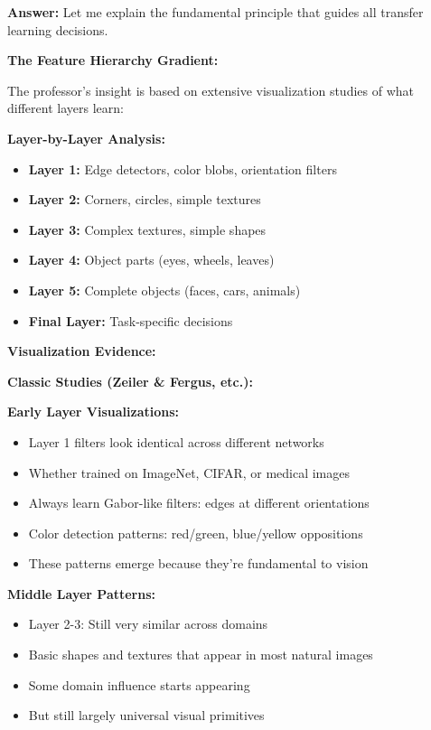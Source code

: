 \documentclass[12pt]{article}
\newcommand{\answer}[1]{{\color{answercolor}\textbf{Answer:} #1}}
\newcommand{\explanation}[1]{{\color{explanationcolor}#1}}
\begin{document}
\begin{enumerate}[(a)]
    \answer{
    Let me explain the fundamental principle that guides all transfer learning decisions.
    
    \textbf{The Feature Hierarchy Gradient:}
    
    \explanation{
    The professor's insight is based on extensive visualization studies of what different layers learn:
    
    \textbf{Layer-by-Layer Analysis:}
    \begin{itemize}
        \item \textbf{Layer 1:} Edge detectors, color blobs, orientation filters
        \item \textbf{Layer 2:} Corners, circles, simple textures
        \item \textbf{Layer 3:} Complex textures, simple shapes
        \item \textbf{Layer 4:} Object parts (eyes, wheels, leaves)
        \item \textbf{Layer 5:} Complete objects (faces, cars, animals)
        \item \textbf{Final Layer:} Task-specific decisions
    \end{itemize}
    }
    
    \textbf{Visualization Evidence:}
    
    \explanation{
    \textbf{Classic Studies (Zeiler \& Fergus, etc.):}
    
    \textbf{Early Layer Visualizations:}
    \begin{itemize}
        \item Layer 1 filters look identical across different networks
        \item Whether trained on ImageNet, CIFAR, or medical images
        \item Always learn Gabor-like filters: edges at different orientations
        \item Color detection patterns: red/green, blue/yellow oppositions
        \item These patterns emerge because they're fundamental to vision
    \end{itemize}
    
    \textbf{Middle Layer Patterns:}
    \begin{itemize}
        \item Layer 2-3: Still very similar across domains
        \item Basic shapes and textures that appear in most natural images
        \item Some domain influence starts appearing
        \item But still largely universal visual primitives
    \end{itemize}
    
}}
\end{enumerate}
\end{document}
